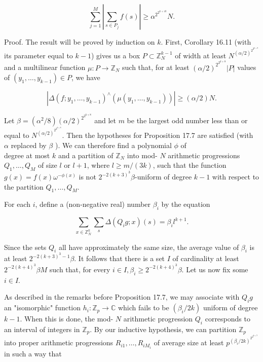 \documentclass[10pt]{article}
\begin{document}
$$
\sum_{j=1}^{M}\left|\sum_{s \in P_{j}} f(s)\right| \geqslant \alpha^{2^{2^{k+10}}} N .
$$

Proof. The result will be proved by induction on $k$. First, Corollary 16.11 (with its parameter equal to $k-1$) gives us a box $P \subset \mathbb{Z}_{N}^{k-1}$ of width at least $N^{(\alpha / 2)^{2^{2^{k+8}}}}$ and a multilinear function $\mu: P \rightarrow \mathbb{Z}_{N}$ such that, for at least $(\alpha / 2)^{2^{2^{k+8}}}|P|$ values of $\left(y_{1}, \ldots, y_{k-1}\right) \in P$, we have

$$
\left|\Delta\left(f ; y_{1}, \ldots, y_{k-1}\right)^{\wedge}\left(\mu\left(y_{1}, \ldots, y_{k-1}\right)\right)\right| \geqslant(\alpha / 2) N .
$$

Let $\beta=\left(\alpha^{2} / 8\right)(\alpha / 2)^{2^{2^{k+8}}}$ and let $m$ be the largest odd number less than or equal to $N^{(\alpha / 2)^{2^{2^{k+8}}}}$. Then the hypotheses for Proposition 17.7 are satisfied (with $\alpha$ replaced by $\beta$ ). We can therefore find a polynomial $\phi$ of\\
degree at most $k$ and a partition of $\mathbb{Z}_{N}$ into mod- $N$ arithmetic progressions $Q_{1}, \ldots, Q_{M}$ of size $l$ or $l+1$, where $l \geqslant m /(3 k)$, such that the function $g(x)=f(x) \omega^{-\phi(x)}$ is not $2^{-2(k+3)^{3}} \beta$-uniform of degree $k-1$ with respect to the partition $Q_{1}, \ldots, Q_{M}$.

For each $i$, define a (non-negative real) number $\beta_{i}$ by the equation

$$
\sum_{x \in \mathbb{Z}_{N}^{k}} \sum_{s} \Delta\left(Q_{i} g ; x\right)(s)=\beta_{i} l^{k+1} .
$$

Since the sets $Q_{i}$ all have approximately the same size, the average value of $\beta_{i}$ is at least $2^{-2(k+3)^{3}-1} \beta$. It follows that there is a set $I$ of cardinality at least $2^{-2(k+4)^{3}} \beta M$ such that, for every $i \in I, \beta_{i} \geqslant 2^{-2(k+4)^{3}} \beta$. Let us now fix some $i \in I$.

As described in the remarks before Proposition 17.7, we may associate with $Q_{i} g$ an "isomorphic" function $h_{i}: \mathbb{Z}_{p} \rightarrow \mathbb{C}$ which fails to be $\left(\beta_{i} / 2 k\right)$ uniform of degree $k-1$. When this is done, the mod- $N$ arithmetic progression $Q_{i}$ corresponds to an interval of integers in $\mathbb{Z}_{p}$. By our inductive hypothesis, we can partition $\mathbb{Z}_{p}$ into proper arithmetic progressions $R_{i 1}, \ldots, R_{i M_{i}}$ of average size at least $p^{\left(\beta_{i} / 2 k\right)^{2^{2^{k+9}}}}$ in such a way that
\end{document}
